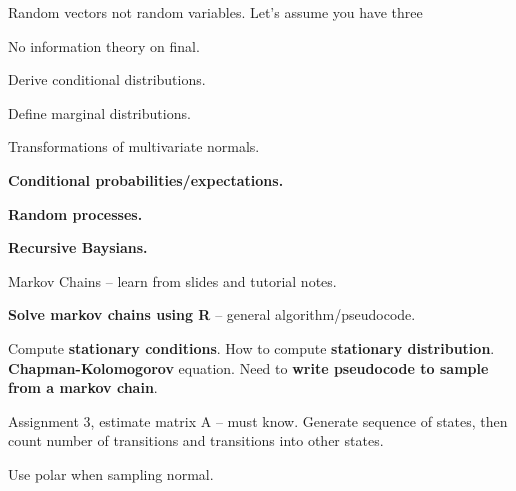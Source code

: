 \documentclass{report}
\begin{document}
Random vectors not random variables. Let's assume you have three 






No information theory on final.

Derive conditional distributions. 

Define marginal distributions. 

Transformations of multivariate normals. 

\textbf{Conditional probabilities/expectations.}

\textbf{Random processes.}

\textbf{Recursive Baysians.}

Markov Chains -- learn from slides and tutorial notes.

\textbf{Solve markov chains using R} -- general algorithm/pseudocode.

Compute \textbf{stationary conditions}. How to compute \textbf{stationary distribution}. \textbf{Chapman-Kolomogorov} equation. Need to \textbf{write pseudocode to sample from a markov chain}.

Assignment 3, estimate matrix A -- must know. Generate sequence of states, then count number of transitions and transitions into other states.


Use polar when sampling normal.
\end{document}

